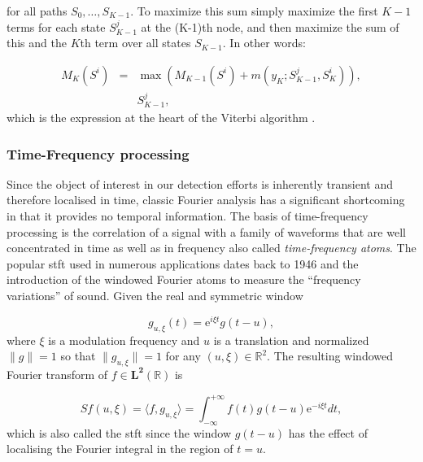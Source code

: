 for all paths $S_0,\ldots, S_{K-1}$.
To maximize this sum simply maximize the first $K-1$ terms for each state $S^j_{K-1}$ at the (K-1)th node, and then maximize the sum of this and the $K$th term over all states $S_{K-1}$. In other words:

\begin{eqnarray}\label{eq:viterbiLitRev5}
M_K(S^i) &=& \max \left( M_{K-1}(S^i) + m(y_K ; S_{K-1}^j, S_{K}^i)\right), \\ \nonumber
& & S_{K-1}^j,
\end{eqnarray}
which is the expression at the heart of the Viterbi algorithm \cite{Viterbi2006}.


\subsubsection{Time-Frequency processing}
Since the object of interest in our detection efforts is inherently transient and therefore localised in time, classic Fourier analysis has a significant shortcoming in that it provides no temporal information. The basis of time-frequency processing is the correlation of a signal with a family of waveforms that are well concentrated in time as well as in frequency \cite{Mallat1999} also called \emph{time-frequency atoms}\cite{Gabor1946}. The popular \gls{stft} used in numerous applications dates back to 1946 and the introduction of the windowed Fourier atoms to measure the ``frequency variations'' of sound. Given the real and symmetric window

\begin{equation}\label{eq:Mallat1999}
g_{u,\xi}(t) = \mathrm{e}^{i\xi t}g(t-u),
\end{equation}
where $\xi$ is a modulation frequency and $u$ is a translation and normalized $\|g\| = 1$ so that $\|g_{u,\xi}\| = 1$ for any $(u, \xi) \in \mathbb{R}^2$. The resulting windowed Fourier transform of $f \in \mathbf{L^2}(\mathbb{R})$ is

\begin{equation}\label{eq:Mallat1999_2}
S f(u, \xi) = \langle f, g_{u,\xi} \rangle = \int^{+\infty}_{-\infty}  f(t)g(t-u)\mathrm{e}^{-i\xi t} dt,
\end{equation}
which is also called the \gls{stft} since the window $g(t-u)$ has the effect of localising the Fourier integral in the region of $t=u$.

